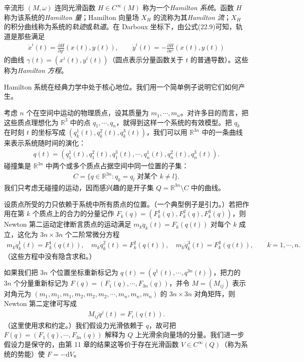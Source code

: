 \documentclass[../../main.tex]{subfiles}
\begin{document}
辛流形 $(M,\omega)$ 连同光滑函数 $H\in C^\infty(M)$ 称为一个\emph{Hamilton 系统}。函数 $H$ 称为该系统的\emph{Hamilton 量}；Hamilton 向量场 $X_H$ 的流称为其\emph{Hamilton 流}；$X_H$ 的积分曲线称为系统的\emph{轨迹}或\emph{轨道}。在 Darboux 坐标下，由公式(22.9)可知，轨道是那些满足
\begin{align}
\dot x^i(t)=\frac{\partial H}{\partial y^i}(x(t),y(t)),\qquad
\dot y^i(t)=-\frac{\partial H}{\partial x^i}(x(t),y(t))
\end{align}
的曲线 $\gamma(t)=(x^i(t),y^i(t))$（圆点表示分量函数关于 $t$ 的普通导数）。这些称为\emph{Hamilton 方程}。

Hamilton 系统在经典力学中处于核心地位。我们用一个简单例子说明它们如何产生。

\begin{example}[$n$ 体问题]\label{example:ch22-n-body}
考虑 $n$ 个在空间中运动的物理质点，设其质量为 $m_1,\cdots ,m_n$。对许多目的而言，把这些质点理想化为 $\mathbb{R}^3$ 中的点 $q_1,\cdots ,q_n$，就得到这样一个系统的有效模型。把 $q_k$ 在时刻 $t$ 的坐标写成 $(q_k^1(t),q_k^2(t),q_k^3(t))$，我们可以用 $\mathbb{R}^{3n}$ 中的一条曲线来表示系统随时间的演化：
\begin{align*}
q(t)=(q_1^1(t),q_1^2(t),q_1^3(t),\cdots ,q_n^1(t),q_n^2(t),q_n^3(t)).
\end{align*}
碰撞集是 $\mathbb{R}^{3n}$ 中两个或多个质点占据空间中同一位置的子集：
\begin{align*}
C=\{q\in\mathbb{R}^{3n}:q_k=q_l\text{ 对某个 }k\neq l\}.
\end{align*}
我们只考虑无碰撞的运动，因而感兴趣的是开子集 $Q=\mathbb{R}^{3n}\setminus C$ 中的曲线。

设质点所受的力只依赖于系统中所有质点的位置。（一个典型例子是引力。）若把作用在第 $k$ 个质点上的合力的分量记作 $F_k(q)=(F_k^1(q),F_k^2(q),F_k^3(q))$，则 Newton 第二运动定律断言质点的运动满足 $m_k\ddot q_k(t)=F_k(q(t))$ 对每个 $k$ 成立，这化为 $3n\times3n$ 个二阶常微分方程
\begin{align*}
m_k\ddot q_k^1(t)=F_k^1(q(t)),\quad
m_k\ddot q_k^2(t)=F_k^2(q(t)),\quad
m_k\ddot q_k^3(t)=F_k^3(q(t)),\qquad k=1,\cdots ,n.
\end{align*}
（这些方程中没有隐含求和。）

如果我们把 $3n$ 个位置坐标重新标记为 $q(t)=(q^1(t),\cdots ,q^{3n}(t))$，把力的 $3n$ 个分量重新标记为 $F(q)=(F_1(q),\cdots ,F_{3n}(q))$，并令 $M=(M_{ij})$ 表示对角元为 $(m_1,m_1,m_1,m_2,m_2,m_2,\cdots ,m_n,m_n,m_n)$ 的 $3n\times3n$ 对角矩阵，则 Newton 第二定律可写成
\begin{align}
M_{ij}\ddot q^j(t)=F_i(q(t)).
\end{align}
（这里使用求和约定。）我们假设力光滑依赖于 $q$，故可把 $F(q)=(F_1(q),\cdots ,F_{3n}(q))$ 解释为 $Q$ 上光滑余向量场的分量。我们进一步假设力是保守的，由第 11 章的结果这等价于存在光滑函数 $V\in C^\infty(Q)$（称为系统的势能）使 $F=-\mathrm{d}V$。


\end{example}
\end{document}
